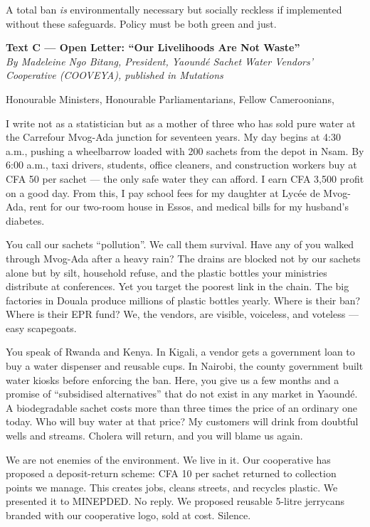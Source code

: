 \documentclass[11pt]{article}
\newcommand{\cle}[1]{{\popxbold\color{popdark}#1}}
\begin{document}
A total ban \emph{is} environmentally necessary but socially reckless if implemented without these safeguards. Policy must be both green and just.

\textbf{Text C --- Open Letter: ``Our Livelihoods Are Not Waste''} \\
\textit{By Madeleine Ngo Bitang, President, Yaoundé Sachet Water Vendors' Cooperative (COOVEYA), published in \textit{Mutations}}

Honourable Ministers, Honourable Parliamentarians, Fellow Cameroonians,

I write not as a statistician but as a mother of three who has sold \cle{pure water} at the Carrefour Mvog-Ada junction for seventeen years. My day begins at 4:30 a.m., pushing a wheelbarrow loaded with 200 sachets from the depot in Nsam. By 6:00 a.m., taxi drivers, students, office cleaners, and construction workers buy at CFA 50 per sachet --- the only safe water they can afford. I earn CFA 3,500 profit on a good day. From this, I pay school fees for my daughter at Lycée de Mvog-Ada, rent for our two-room house in Essos, and medical bills for my husband's diabetes.

You call our sachets ``pollution''. We call them survival. Have any of you walked through Mvog-Ada after a heavy rain? The drains are blocked not by our sachets alone but by silt, household refuse, and the plastic bottles your ministries distribute at conferences. Yet you target the poorest link in the chain. The big factories in Douala produce millions of plastic bottles yearly. Where is their ban? Where is their EPR fund? We, the vendors, are visible, voiceless, and voteless --- easy scapegoats.

You speak of Rwanda and Kenya. In Kigali, a vendor gets a government loan to buy a water dispenser and reusable cups. In Nairobi, the county government built water kiosks before enforcing the ban. Here, you give us a few months and a promise of ``subsidised alternatives'' that do not exist in any market in Yaoundé. A biodegradable sachet costs more than three times the price of an ordinary one today. Who will buy water at that price? My customers will drink from doubtful wells and streams. Cholera will return, and you will blame us again.

We are not enemies of the environment. We live in it. Our cooperative has proposed a \cle{deposit-return scheme}: CFA 10 per sachet returned to collection points we manage. This creates jobs, cleans streets, and recycles plastic. We presented it to MINEPDED. No reply. We proposed reusable 5-litre jerrycans branded with our cooperative logo, sold at cost. Silence.
\end{document}
